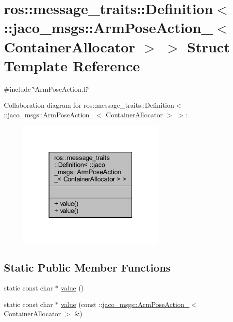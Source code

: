 \hypertarget{structros_1_1message__traits_1_1Definition_3_01_1_1jaco__msgs_1_1ArmPoseAction___3_01ContainerAllocator_01_4_01_4}{}\section{ros\+:\+:message\+\_\+traits\+:\+:Definition$<$ \+:\+:jaco\+\_\+msgs\+:\+:Arm\+Pose\+Action\+\_\+$<$ Container\+Allocator $>$ $>$ Struct Template Reference}
\label{structros_1_1message__traits_1_1Definition_3_01_1_1jaco__msgs_1_1ArmPoseAction___3_01ContainerAllocator_01_4_01_4}


{\ttfamily \#include \char`\"{}Arm\+Pose\+Action.\+h\char`\"{}}



Collaboration diagram for ros\+:\+:message\+\_\+traits\+:\+:Definition$<$ \+:\+:jaco\+\_\+msgs\+:\+:Arm\+Pose\+Action\+\_\+$<$ Container\+Allocator $>$ $>$\+:
\nopagebreak
\begin{figure}[H]
\begin{center}
\leavevmode
\includegraphics[width=208pt]{d7/dd3/structros_1_1message__traits_1_1Definition_3_01_1_1jaco__msgs_1_1ArmPoseAction___3_01ContainerAllocator_01_4_01_4__coll__graph}
\end{center}
\end{figure}
\subsection*{Static Public Member Functions}
\begin{DoxyCompactItemize}
\item 
static const char $\ast$ \hyperlink{structros_1_1message__traits_1_1Definition_3_01_1_1jaco__msgs_1_1ArmPoseAction___3_01ContainerAllocator_01_4_01_4_a1540c4759505cf0d7d36b8f3eeb18d0f}{value} ()
\item 
static const char $\ast$ \hyperlink{structros_1_1message__traits_1_1Definition_3_01_1_1jaco__msgs_1_1ArmPoseAction___3_01ContainerAllocator_01_4_01_4_a5406370dab951b944714230b0aaa86ef}{value} (const \+::\hyperlink{structjaco__msgs_1_1ArmPoseAction__}{jaco\+\_\+msgs\+::\+Arm\+Pose\+Action\+\_\+}$<$ Container\+Allocator $>$ \&)
\end{DoxyCompactItemize}


